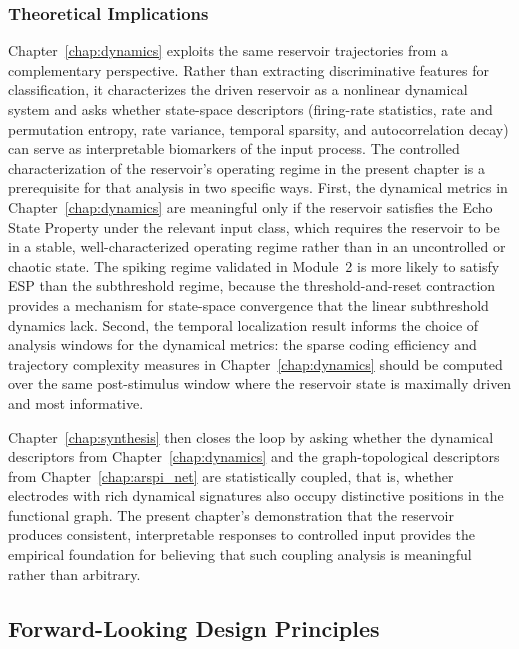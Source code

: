 \subsubsection{Theoretical Implications}

Chapter~\ref{chap:dynamics} exploits the same reservoir trajectories from a complementary perspective. Rather than extracting discriminative features for classification, it characterizes the driven reservoir as a nonlinear dynamical system and asks whether state-space descriptors (firing-rate statistics, rate and permutation entropy, rate variance, temporal sparsity, and autocorrelation decay) can serve as interpretable biomarkers of the input process. The controlled characterization of the reservoir's operating regime in the present chapter is a prerequisite for that analysis in two specific ways. First, the dynamical metrics in Chapter~\ref{chap:dynamics} are meaningful only if the reservoir satisfies the Echo State Property under the relevant input class, which requires the reservoir to be in a stable, well-characterized operating regime rather than in an uncontrolled or chaotic state. The spiking regime validated in Module~2 is more likely to satisfy ESP than the subthreshold regime, because the threshold-and-reset contraction provides a mechanism for state-space convergence that the linear subthreshold dynamics lack. Second, the temporal localization result informs the choice of analysis windows for the dynamical metrics: the sparse coding efficiency and trajectory complexity measures in Chapter~\ref{chap:dynamics} should be computed over the same post-stimulus window where the reservoir state is maximally driven and most informative.

Chapter~\ref{chap:synthesis} then closes the loop by asking whether the dynamical descriptors from Chapter~\ref{chap:dynamics} and the graph-topological descriptors from Chapter~\ref{chap:arspi_net} are statistically coupled, that is, whether electrodes with rich dynamical signatures also occupy distinctive positions in the functional graph. The present chapter's demonstration that the reservoir produces consistent, interpretable responses to controlled input provides the empirical foundation for believing that such coupling analysis is meaningful rather than arbitrary.

\subsection{Forward-Looking Design Principles}


